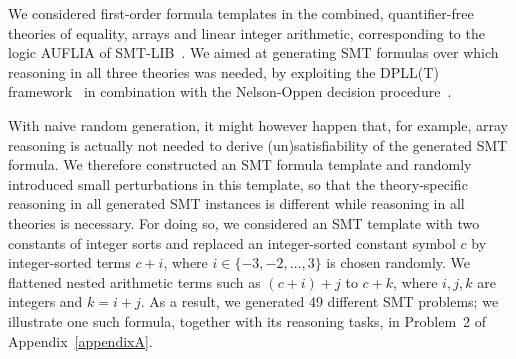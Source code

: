 We considered first-order formula templates in the combined,
quantifier-free 
theories of equality, arrays and linear integer arithmetic,
corresponding to the logic AUFLIA of
SMT-LIB~\cite{barrett2017smtlib}. We aimed at generating SMT formulas
over which reasoning in all three theories was needed, by exploiting
the DPLL(T) framework~\cite{Tinelli02} in combination with the
Nelson-Oppen decision procedure~\cite{Nelson79}.
%

With naive random generation, it might however happen
that, for example, array reasoning is actually not needed to derive
(un)satisfi\-ability of the generated SMT formula. We therefore constructed an
SMT formula template and randomly introduced small perturbations in this template,
so that the theory-specific reasoning in all generated SMT instances is
different while reasoning in all theories is necessary.
%
For doing so, we considered an SMT template with two constants of
integer sorts and replaced an integer-sorted constant symbol $c$ by  integer-sorted terms $c+i$,
where $i \in \{-3,-2,\dots,3\}$ is chosen randomly. We flattened nested arithmetic terms such as $(c+i)+j$ to $c+k$,
where $i,j,k$ are integers and $k = i+j$. As a result, we
generated 49 different SMT problems; we illustrate one such formula, together
with its reasoning tasks, in Problem~2 of Appendix~\ref{appendixA}.
